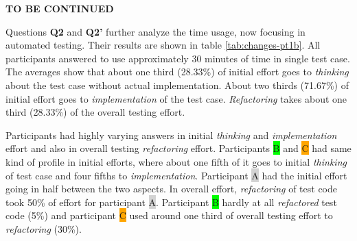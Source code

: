 \textbf{TO BE CONTINUED}

\clearpage

Questions \textbf{Q2} and \textbf{Q2'} further analyze the time usage, now focusing in automated testing. Their results are
shown in table \ref{tab:changes-pt1b}. All participants answered to use approximately 30 minutes of time in single test case. The
averages show that about one third (28.33\%) of initial effort goes to \textit{thinking} about the test case without actual implementation.
About two thirds (71.67\%) of initial effort goes to \textit{implementation} of the test case. \textit{Refactoring} takes about one third (28.33\%)
of the overall testing effort.

Participants had highly varying answers in initial \textit{thinking} and \textit{implementation} effort and also
in overall testing \textit{refactoring} effort. Participants {\colorbox{lime}B} and {\colorbox{orange}C} had same kind of profile
in initial efforts, where about one fifth of it goes to initial \textit{thinking} of test case and four fifths to \textit{implementation}.
Participant {\colorbox{lightgray}A} had the initial effort going in half between the two aspects. In overall effort,
\textit{refactoring} of test code took 50\% of effort for participant {\colorbox{lightgray}A}. Participant {\colorbox{lime}B}
hardly at all \textit{refactored} test code (5\%) and participant {\colorbox{orange}C} used around one third of overall testing effort
to \textit{refactoring} (30\%).



